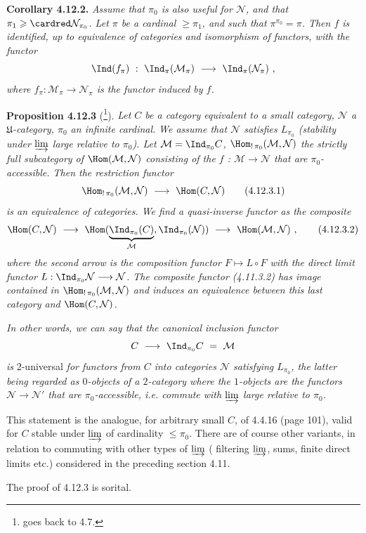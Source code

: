 \textbf{Corollary 4.12.2.} \textit{Assume that $\pi_0$ is also useful for $\mathcal{N}$, and that $\pi_1 \geqslant \cardred \mathcal{N}_{\pi_0}$. Let $\pi$ be a cardinal $\geqslant \pi_1$, and such that $\pi^{\pi_0} = \pi$. Then $f$ is identified, up to equivalence of categories and isomorphism of functors, with the functor}
\[
\Ind(f_\pi) \ : \ \Ind_\pi(\mathcal{M}_\pi) \ \longrightarrow \ \Ind_\pi(\mathcal{N}_\pi) \ ,
\]
\textit{where $f_\pi : \mathcal{M}_\pi \longrightarrow \mathcal{N}_\pi$ is the functor induced by $f$.}

\textbf{Proposition 4.12.3} (\footnote{goes back to 4.7.}). \textit{Let $C$ be a category equivalent to a small category, $\mathcal{N}$ a $\mathfrak{U}$-category, $\pi_0$ an infinite cardinal.}  \textit{We assume that $\mathcal{N}$ satisfies $L_{\pi_0}$ (stability under $\varinjlim$ large relative to $\pi_0$). Let $\mathcal{M} = \Ind_{\pi_0} C$, $\Hom_{!\,\pi_0}(\mathcal{M},\mathcal{N})$ the strictly full subcategory of $\Hom(\mathcal{M},\mathcal{N})$ consisting of the $f$ : $\mathcal{M} \longrightarrow \mathcal{N}$ that are $\pi_0$-accessible. Then the restriction functor}
\[
\Hom_{!\,\pi_0}(\mathcal{M},\mathcal{N}) \ \longrightarrow \ \Hom(C,\mathcal{N}) \tag*{(4.12.3.1)}
\]
\textit{is an equivalence of categories. We find a quasi-inverse functor as the composite}
\[
\Hom(C,\mathcal{N}) \ \longrightarrow \ \Hom(\underbrace{\Ind_{\pi_0}(C)}_{\mathcal{M}},\Ind_{\pi_0}(\mathcal{N})) \ \longrightarrow \ \Hom(\mathcal{M},\mathcal{N}) \ , \tag*{(4.12.3.2)}
\]
\textit{where the second arrow is the composition functor $F \longmapsto L \circ F$ with the direct limit functor $L : \Ind_{\pi_0}\mathcal{N} \longrightarrow \mathcal{N}$. The composite functor (4.11.3.2) has image contained in $\Hom_{!\,\pi_0}(\mathcal{M},\mathcal{N})$ and induces an equivalence between this last category and $\Hom(C,\mathcal{N})$.} %


\textit{In other words, we can say that the canonical inclusion functor}
\[
C \ \longrightarrow \ \Ind_{\pi_0} C \ = \ \mathcal{M}
\]
\textit{is} 2-universal \textit{for functors from $C$ into categories $\mathcal{N}$ satisfying $L_{\pi_0}$, the latter being regarded as $0$-objects of a $2$-category where the $1$-objects are the functors $\mathcal{N} \longrightarrow \mathcal{N}'$ that are $\pi_0$-accessible, i.e. commute with $\varinjlim$ large relative to $\pi_0$.}

This statement is the analogue, for arbitrary small $C$, of 4.4.16 (page 101), valid for $C$ stable under $\varinjlim$ of cardinality $\leqslant \pi_0$. There are of course other variants, in relation to commuting with other types of $\varinjlim$ ( filtering $\varinjlim$, sums, finite direct limits etc.) considered in the preceding section 4.11.

The proof of 4.12.3 is sorital.